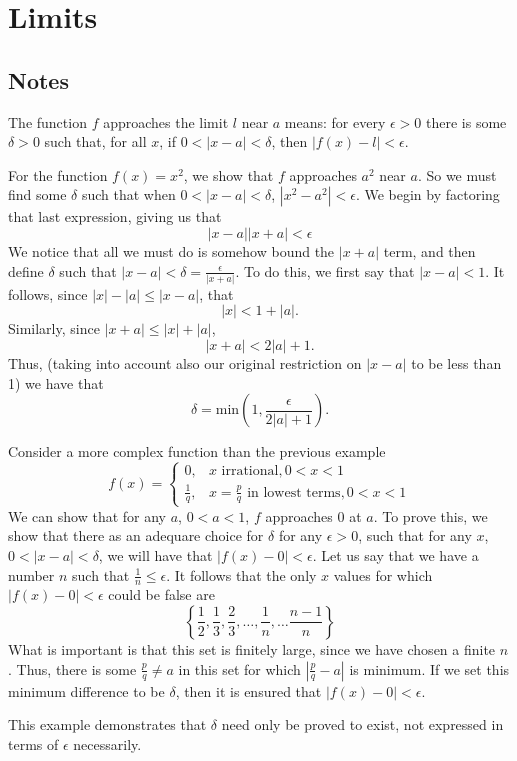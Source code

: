 \section{Limits}

\subsection{Notes}
\begin{definition}
The function $f$ approaches the limit $l$ near $a$ means: for every $\epsilon > 0$ there is some $\delta > 0$ such that, for all $x$, if $0 < |x - a| < \delta$, then $|f(x) - l| < \epsilon$.
\end{definition}

\begin{example}
For the function $f(x) = x^2$, we show that $f$ approaches $a^2$ near $a$. So we must find some $\delta$ such that when $0 < |x - a| < \delta$, $|x^2 - a^2| < \epsilon$. We begin by factoring that last expression, giving us that
\[ |x - a||x + a| < \epsilon \]
We notice that all we must do is somehow bound the $|x + a|$ term, and then define $\delta$ such that $|x - a| < \delta = \frac{\epsilon}{|x + a|}$. To do this, we first say that $|x - a| < 1$. It follows, since $|x| - |a| \le |x - a|$, that
\[ |x| < 1 + |a|. \]
Similarly, since $|x + a| \le |x| + |a|$,
\[ |x + a| < 2|a| + 1. \]
Thus, (taking into account also our original restriction on $|x - a|$ to be less than 1) we have that
\[ \delta = \textrm{min}\left(1, \frac{\epsilon}{2|a| + 1}\right). \]
\end{example}

\begin{example}
Consider a more complex function than the previous example
\[ f(x) = \begin{cases} 0, & x \textrm{ irrational}, 0 < x < 1 \\ \frac{1}{q}, & x = \frac{p}{q} \textrm{ in lowest terms}, 0 < x < 1 \end{cases}\]
We can show that for any $a$, $0 < a < 1$, $f$ approaches 0 at $a$. To prove this, we show that there as an adequare choice for $\delta$ for any $\epsilon > 0$, such that for any $x$, $0 < |x - a| < \delta$, we will have that $|f(x) - 0| < \epsilon$. Let us say that we have a number $n$ such that $\frac{1}{n} \le \epsilon$. It follows that the only $x$ values for which $|f(x) - 0| < \epsilon$ could be false are
\[ \left\{\frac{1}{2}, \frac{1}{3}, \frac{2}{3}, \ldots, \frac{1}{n}, \ldots \frac{n - 1}{n}\right\} \]
What is important is that this set is finitely large, since we have chosen a finite $n$. Thus, there is some $\frac{p}{q} \ne a$ in this set for which $|\frac{p}{q} - a|$ is minimum. If we set this minimum difference to be $\delta$, then it is ensured that $|f(x) - 0| < \epsilon$. 

\begin{remark}
This example demonstrates that $\delta$ need only be proved to exist, not expressed in terms of $\epsilon$ necessarily.
\end{remark}
\end{example}

